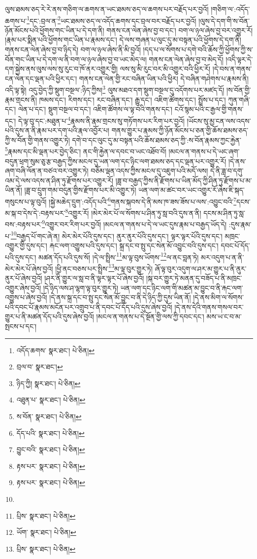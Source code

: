 ལུས་ཐམས་ཅད་རེ་རེ་ནས་གཅིག་ལ་ཆགས་ན་ཡང་ཐམས་ཅད་ལ་ཆགས་པར་བརྗོད་པར་བྱའོ། །གཅིག་ལ་:འདོད་ཆགས་པ་\footnote{འདོད་ཆགས་  སྣར་ཐང་།  པེ་ཅིན། }དང་:བྲལ་ན་\footnote{བྲལ་བ་  སྣར་ཐང་། }ཡང་ཐམས་ཅད་ལ་འདོད་ཆགས་དང་བྲལ་བར་བརྗོད་པར་བྱའོ། །ལུས་དེ་དག་གི་ས་བོན་ཉོན་མོངས་པའི་ཕྱོགས་གང་ཡིན་པ་དེ་དག་ནི། གནས་ངན་ལེན་ཞེས་བྱ་བ་དང་། བག་ལ་ཉལ་ཞེས་བྱ་བར་འགྱུར་རོ། །རྣམ་པར་སྨིན་པའི་ཕྱོགས་གང་ཡིན་པ་རྣམས་དང་། དེ་ལས་གཞན་པ་ལུང་དུ་མ་བསྟན་པའི་ཕྱོགས་དེ་དག་ནི། གནས་ངན་ལེན་ཞེས་བྱ་བ་ཉིད་དེ། བག་ལ་ཉལ་ཞེས་ནི་མི་བྱའོ། །དད་པ་ལ་སོགས་པ་དགེ་བའི་ཆོས་ཀྱི་ཕྱོགས་ཀྱི་ས་བོན་གང་ཡིན་པ་དེ་དག་ལ་ནི་བག་ལ་ཉལ་ཞེས་བྱ་བ་ཡང་མེད་ལ། གནས་ངན་ལེན་ཞེས་བྱ་བ་མེད་དོ། །འདི་ལྟར་དེ་དག་སྐྱེས་ནས་ལུས་ལས་སུ་རུང་བ་ཁོ་ནར་འགྱུར་གྱི། ལས་སུ་མི་རུང་བར་མི་འགྱུར་བའི་ཕྱིར་རོ། །དེ་བས་ན་གནས་ངན་ལེན་དང་ལྡན་པའི་ཕྱིར་དང་། གནས་ངན་ལེན་གྱི་རང་བཞིན་ཡིན་པའི་ཕྱིར། དེ་བཞིན་གཤེགས་པ་རྣམས་ནི། འདི་ལྟ་སྟེ། འདུ་བྱེད་ཀྱི་སྡུག་བསྔལ་:ཉིད་ཀྱིས།\footnote{ཉིད་ཀྱི།  སྣར་ཐང་།  པེ་ཅིན། } ལུས་མཐའ་དག་སྡུག་བསྔལ་དུ་འདོགས་པར་མཛད་དོ། །ས་བོན་གྱི་རྣམ་གྲངས་ནི། ཁམས་དང་། རིགས་དང་། རང་བཞིན་དང་། རྒྱུ་དང་། འཇིག་ཚོགས་དང་། སྤྲོས་པ་དང་། ཀུན་གཞི་དང་། ལེན་པ་དང་། སྡུག་བསྔལ་བ་དང་། འཇིག་ཚོགས་ལ་ལྟ་བའི་གནས་དང་། ངའོ་སྙམ་པའི་ང་རྒྱལ་གྱི་གནས་དང་། དེ་ལྟ་བུ་དང་:མཐུན་པ་\footnote{འཐུན་པ་  སྣར་ཐང་།  པེ་ཅིན། }རྣམས་ནི་རྣམ་གྲངས་སུ་གཏོགས་པར་རིག་པར་བྱའོ། །ཡོངས་སུ་མྱ་ངན་ལས་འདས་པའི་དུས་ན་ནི་རྣམ་པར་དག་པའི་རྣལ་འབྱོར་པ། གནས་གྱུར་པ་རྣམས་ཀྱི་ཉོན་མོངས་པ་ཅན་གྱི་ཆོས་ཐམས་ཅད་ཀྱི་ས་བོན་གྱི་གནས་འགྱུར་ཏེ། དགེ་བ་དང་ལུང་དུ་མ་བསྟན་པའི་ཆོས་ཐམས་ཅད་ཀྱི་:ས་བོན་རྣམས་ཀྱང་རྐྱེན་\footnote{ས་བོན་  སྣར་ཐང་།  པེ་ཅིན། }རྣམས་དང་མི་ལྡན་པར་བྱེད་ཅིང་། ནང་གི་རྐྱེན་ལ་དབང་བ་ཡང་འཐོབ་བོ། །མངལ་ན་གནས་པ་དེ་ཡང་ཞག་བདུན་ཕྲག་སུམ་ཅུ་རྩ་བརྒྱད་ཀྱིས་མངལ་དུ་ཡན་ལག་དང་ཉིང་ལག་ཐམས་ཅད་དང་ལྡན་པར་འགྱུར་རོ། །དེ་ནས་ཞག་བཞི་ལོན་ན་བཙའ་བར་འགྱུར་ཏེ། བཅོམ་ལྡན་འདས་ཀྱིས་མངལ་དུ་འཇུག་པའི་མདོ་ལས། དེ་ནི་ཟླ་བ་དགུ་འམ་དེ་ལས་འདས་ན་ཤིན་ཏུ་རྫོགས་པར་འགྱུར་རོ། །ཟླ་བ་བརྒྱད་ཀྱིས་ནི་རྫོགས་པ་ཡིན་མོད་ཀྱི་ཤིན་ཏུ་རྫོགས་པ་མ་ཡིན་ནོ། །ཟླ་བ་དྲུག་གམ་བདུན་གྱིས་རྫོགས་པར་མི་འགྱུར་ཏེ། ཡན་ལག་མ་ཚང་བར་ཡང་འགྱུར་རོ་ཞེས་ཇི་སྐད་གསུངས་པ་ལྟ་བུའོ། །སྐྱེ་མཆེད་དྲུག་:འདོད་པའི་\footnote{དོད་པའི་  སྣར་ཐང་།  པེ་ཅིན། }གནས་སྐབས་དེ་ནི་མས་ཁ་ཟས་ཟོས་པ་ལས་:འབྱུང་བའི་\footnote{བྱུང་བའི་  སྣར་ཐང་།  པེ་ཅིན། }དངས་མ་སྐ་བ་དེས་དེ་:བརྟས་པར་\footnote{རྟས་པར་  སྣར་ཐང་།  པེ་ཅིན། }འགྱུར་རོ། །མེར་མེར་པོ་ལ་སོགས་པ་ཤིན་ཏུ་སླ་བའི་དུས་ན་ནི། དངས་མ་ཤིན་ཏུ་སླ་བས་:བརྟས་པར་\footnote{རྟས་པར་  སྣར་ཐང་།  པེ་ཅིན། }འགྱུར་བར་རིག་པར་བྱའོ། །མངལ་ན་གནས་པ་དེ་ལ་ཡང་དུས་རྣམ་པ་བརྒྱད་ཡོད་དེ། :དུས་རྣམ་པ་\footnote{}བརྒྱད་པོ་གང་ཞེ་ན། མེར་མེར་པོའི་དུས་དང་། ནུར་ནུར་པོའི་དུས་དང་། ལྟར་ལྟར་པོའི་དུས་དང་། མཁྲང་འགྱུར་གྱི་དུས་དང་། རྐང་ལག་འགྱུས་པའི་དུས་དང་། སྐྲ་དང་བ་སྤུ་དང་སེན་མོ་འབྱུང་བའི་དུས་དང་། དབང་པོ་དོད་པའི་དུས་དང་། མཚན་དོད་པའི་དུས་སོ། །དེ་ལ་སྤྲིས་\footnote{པྲིས་  སྣར་ཐང་།  པེ་ཅིན། }མ་ལྟ་བུས་ཡོགས་\footnote{ཡོག་  སྣར་ཐང་།  པེ་ཅིན། }ལ་ནང་བླན་ཏེ། མར་འདུག་པ་ན་ནི་མེར་མེར་པོ་ཞེས་བྱའོ། །ཕྱི་ནང་བཅས་པར་སྤྲིས་\footnote{པྲིས་  སྣར་ཐང་།  པེ་ཅིན། }མ་ལྟ་བུར་གྱུར་ཏེ། ཞོ་ལྟ་བུར་འདུག་ལ་ཤར་མ་གྱུར་པ་ནི་ནུར་ནུར་པོ་ཞེས་བྱའོ། །ཤར་ནི་གྱུར་ལ་སླ་བ་ནི་ལྟར་ལྟར་པོ་ཞེས་བྱའོ། །སྐ་བར་གྱུར་ཏེ་མནན་དུ་བཟོད་པ་ནི་མཁྲང་འགྱུར་ཞེས་བྱའོ། །དེ་ཉིད་ལས་ཤ་ལྷག་ལྟ་བུར་གྱུར་ཏེ། ཡན་ལག་དང་ཉིང་ལག་གི་མཚན་མ་བྱུང་བ་ནི་རྐང་ལག་འགྱུས་པ་ཞེས་བྱའོ། །དེ་ནས་སྐྲ་དང་བ་སྤུ་དང་སེན་མོ་བྱུང་བ་ནི་དེ་ཉིད་ཀྱི་དུས་ཡིན་ནོ། །དེ་ནས་མིག་ལ་སོགས་པའི་དབང་པོ་རྣམས་མངོན་པར་འགྲུབ་པ་ནི་དབང་པོ་དོད་པའི་དུས་ཞེས་བྱའོ། །དེ་ནས་དེའི་གནས་གསལ་བར་གྱུར་པ་ནི་མཚན་དོད་པའི་དུས་ཞེས་བྱའོ། །མངལ་ན་གནས་པ་དེ་སྔོན་གྱི་ལས་ཀྱི་དབང་དང་། མས་ཡ་ང་བ་མ་སྤངས་པ་དང་། 